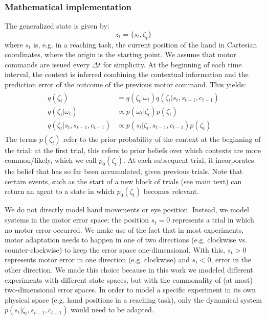 \documentclass[a4paper,doc,floatsintext,natbib]{apa6}%
\begin{document}
\subsubsection{Mathematical implementation}
The generalized state is given by:
\begin{equation}
z_t = \{s_t, \zeta_t\}
\end{equation}
where $s_t$ is, e.g. in a reaching task, the current position of the hand in
Cartesian coordinates, where the origin is the starting point. We assume that
motor commands are issued every $\Delta t$ for simplicity. At the beginning of
each time interval, the context is inferred combining the contextual
information and the prediction error of the outcome of the previous motor
command. This yields:
\begin{align}
  \begin{split}
  q(\zeta_t) &= q(\zeta_t | \omega_t)q(\zeta_t | s_t, s_{t-1}, c_{t-1}) \\ \label{eqn:estimated-context}
  q(\zeta_t | \omega_t) &\propto p(\omega_t | \zeta_t)p(\zeta_t) \\
  q(\zeta_t | s_t, s_{t-1}, c_{t-1}) &\propto p(s_t | \zeta_t, s_{t-1}, c_{t-1})p(\zeta_t)
  \end{split}
\end{align}
The terms $p(\zeta_t)$ refer to the prior probability of the context at the
beginning of the trial: at the first trial, this refers to prior beliefs over
which contexts are more common/likely, which we call $p_0(\zeta_t)$. At each
subsequent trial, it incorporates the belief that has so far been accumulated,
given previous trials. Note that certain events, such as the start of a new
block of trials (see main text) can return an agent to a state in which
$p_0(\zeta_t)$ becomes relevant.

We do not directly model hand movements or eye position. Instead, we model
systems in the motor error space: the position $s_t = 0$ represents a trial in
which no motor error occurred. We make use of the fact that in most
experiments, motor adaptation needs to happen in one of two directions
(e.g. clockwise vs. counter-clockwise) to keep the error space
one-dimensional. With this, $s_t > 0$ represents motor error in one direction
(e.g. clockwise) and $s_t < 0$, error in the other direction. We made this
choice because in this work we modeled different experiments with
different state spaces, but with the commonality of (at most)
two-dimensional error spaces. In order to model a specific experiment in its
own physical space (e.g. hand positions in a reaching task), only the dynamical
system  $p(s_t | \zeta_t, s_{t-1}, c_{t-1})$ would need to be adapted.
\end{document}
